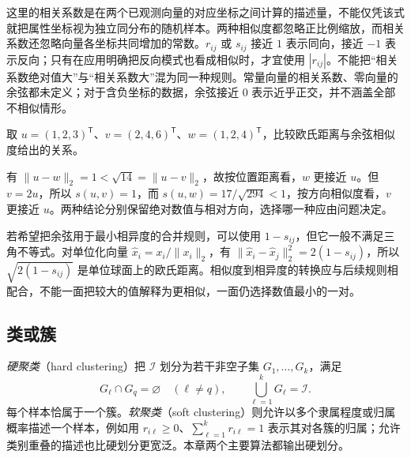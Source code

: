 这里的相关系数是在两个已观测向量的对应坐标之间计算的描述量，不能仅凭该式就把属性坐标视为独立同分布的随机样本。两种相似度都忽略正比例缩放，而相关系数还忽略向量各坐标共同增加的常数。$r_{ij}$ 或 $s_{ij}$ 接近 $1$ 表示同向，接近 $-1$ 表示反向；只有在应用明确把反向模式也看成相似时，才宜使用 $|r_{ij}|$。不能把“相关系数绝对值大”与“相关系数大”混为同一种规则。常量向量的相关系数、零向量的余弦都未定义；对于含负坐标的数据，余弦接近 $0$ 表示近乎正交，并不涵盖全部不相似情形。

\begin{example}
\label{ex:lh-cluster-metric-choice}
取 $u=(1,2,3)^{\mathsf T}$、$v=(2,4,6)^{\mathsf T}$、$w=(1,2,4)^{\mathsf T}$，比较欧氏距离与余弦相似度给出的关系。
\end{example}
\begin{solve}
有 $\|u-w\|_2=1<\sqrt{14}=\|u-v\|_2$，故按位置距离看，$w$ 更接近 $u$。但 $v=2u$，所以 $s(u,v)=1$，而 $s(u,w)=17/\sqrt{294}<1$，按方向相似度看，$v$ 更接近 $u$。两种结论分别保留绝对数值与相对方向，选择哪一种应由问题决定。
\end{solve}

若希望把余弦用于最小相异度的合并规则，可以使用 $1-s_{ij}$，但它一般不满足三角不等式。对单位化向量 $\widehat x_i=x_i/\|x_i\|_2$，有 $\|\widehat x_i-\widehat x_j\|_2^2=2(1-s_{ij})$，所以 $\sqrt{2(1-s_{ij})}$ 是单位球面上的欧氏距离。相似度到相异度的转换应与后续规则相配合，不能一面把较大的值解释为更相似，一面仍选择数值最小的一对。

\subsection{类或簇}
\label{subsec:lh-cluster-clusters}

\begin{definition}[硬聚类与软聚类]
\label{def:lh-cluster-partition}
\emph{硬聚类}（hard clustering）把 $\mathcal I$ 划分为若干非空子集 $G_1,\ldots,G_k$，满足
\begin{equation}
G_\ell\cap G_q=\varnothing\quad(\ell\ne q),\qquad
\bigcup_{\ell=1}^kG_\ell=\mathcal I.
\label{eq:lh-cluster-partition}
\end{equation}
每个样本恰属于一个簇。\emph{软聚类}（soft clustering）则允许以多个隶属程度或归属概率描述一个样本，例如用 $r_{i\ell}\geq0$、$\sum_{\ell=1}^k r_{i\ell}=1$ 表示其对各簇的归属；允许类别重叠的描述也比硬划分更宽泛。本章两个主要算法都输出硬划分。
\end{definition}

